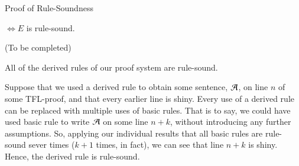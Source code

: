 \documentclass[12pt, a4paper, twoside, openright, titlepage]{book}
\begin{document}
\begin{proof*}{Proof of Rule-Soundness}{}
    \begin{claim*}{13}{}
        $\iff E$ is rule-sound.
    \end{claim*}
    (To be completed)


    \begin{claim*}{14}{}
        All of the derived rules of our proof system are rule-sound.
    \end{claim*}
    Suppose that we used a derived rule to obtain some sentence, $\mathcal{A}$, on line $n$ of some TFL-proof, and that every earlier line is shiny. Every use of a derived rule can be replaced with multiple uses of basic rules. That is to say, we could have used basic rule to write $\mathcal{A}$ on some line $n+k$, without introducing any further assumptions. So, applying our individual results that all basic rules are rule-sound sever times ($k+1$ times, in fact), we can see that line $n+k$ is shiny. Hence, the derived rule is rule-sound.
\end{proof*}







\begin{appendices}

\end{appendices}
\end{document}
